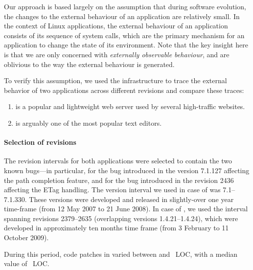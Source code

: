 

Our approach is based largely on the assumption that during software evolution,
the changes to the external behaviour of an application are relatively small.
In the context of Linux applications, the external behaviour of an application
consists of its sequence of system calls, which are the primary mechanism for
an application to change the state of its environment.  Note that the key
insight here is that we are only concerned with \emph{externally observable
behaviour}, and are oblivious to the way the external behaviour is generated.

To verify this assumption, we used the \covrig infrastructure to trace the
external behavior of two applications across different revisions and compare
these traces:

\begin{enumerate}
\item[\lighttpd\footnote{\url{http://www.lighttpd.net/}}] is a popular and
  lightweight web server used by several high-traffic websites. 

\item[\vim\footnote{\url{http://www.vim.org/}}] is arguably one of the most
  popular text editors.
\end{enumerate}

\paragraph{Selection of revisions} The revision intervals for both applications
were selected to contain the two known bugs---in particular, for \vim the bug
introduced in the version 7.1.127 affecting the path completion feature, and for
\lighttpd the bug introduced in the revision 2436 affecting the ETag handling. The
version interval we used in case of \vim was 7.1--7.1.330. These versions were
developed and released in slightly-over one year time-frame (from 12 May 2007
to 21 June 2008). In case of \lighttpd, we used the interval spanning revisions
2379--2635 (overlapping versions 1.4.21--1.4.24), which were developed in
approximately ten months time frame (from 3 February to 11 October 2009).

During this period, code patches in \lighttpd varied between
\lighttpdMinPatch and \lighttpdMaxPatch~LOC, with a median value of 
\lighttpdMedPatch~LOC.


